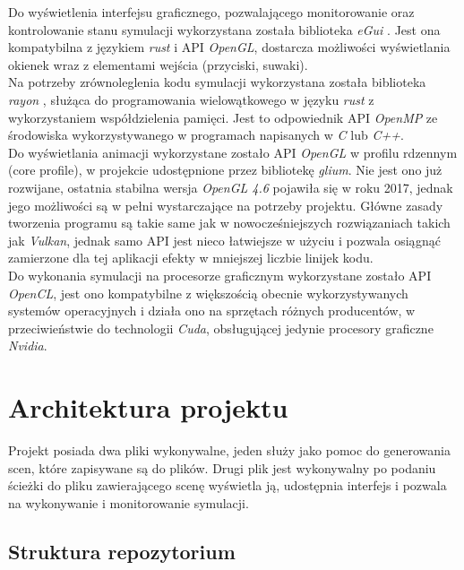 \documentclass[12pt, letterpaper]{report}
\begin{document}
    Do wyświetlenia interfejsu graficznego, pozwalającego monitorowanie oraz kontrolowanie stanu symulacji  
    wykorzystana została biblioteka \emph{eGui} \cite{egui}. Jest ona kompatybilna z językiem \emph{rust} 
    i API \emph{OpenGL}, dostarcza możliwości wyświetlania okienek wraz z elementami wejścia (przyciski, suwaki). \\

    Na potrzeby zrównoleglenia kodu symulacji wykorzystana została biblioteka \emph{rayon} \cite{rayon}, służąca
    do programowania wielowątkowego w języku \emph{rust} z wykorzystaniem współdzielenia pamięci. 
    Jest to odpowiednik API \emph{OpenMP} ze środowiska wykorzystywanego w 
    programach napisanych w \emph{C} lub \emph{C++}. \\
    
    Do wyświetlania animacji wykorzystane zostało API \emph{OpenGL} w profilu rdzennym (core profile), w projekcie
    udostępnione przez bibliotekę \emph{glium}. Nie jest ono już rozwijane, ostatnia stabilna wersja 
    \emph{OpenGL 4.6} pojawiła się w roku 2017, jednak jego możliwości są w pełni wystarczające
    na potrzeby projektu. Główne zasady tworzenia programu są takie same jak w nowocześniejszych rozwiązaniach 
    takich jak \emph{Vulkan}, jednak samo API jest nieco łatwiejsze w użyciu i pozwala osiągnąć zamierzone 
    dla tej aplikacji efekty w mniejszej liczbie linijek kodu. \\
    
    Do wykonania symulacji na procesorze graficznym wykorzystane zostało API \emph{OpenCL}, jest ono kompatybilne
    z większością obecnie wykorzystywanych systemów operacyjnych i działa ono na sprzętach różnych producentów, 
    w przeciwieństwie do technologii \emph{Cuda}, obsługującej jedynie procesory graficzne \emph{Nvidia}.
    
    \section{Architektura projektu}
    Projekt posiada dwa pliki wykonywalne, jeden służy jako pomoc do generowania scen, które zapisywane są 
    do plików. Drugi plik jest wykonywalny po podaniu ścieżki do pliku zawierającego scenę wyświetla ją, 
    udostępnia interfejs i pozwala na wykonywanie i monitorowanie symulacji.

    \subsection{Struktura repozytorium}
\end{document}
